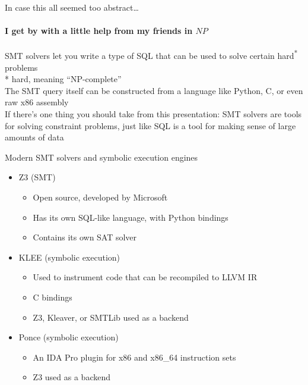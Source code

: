 \begin{frame}{In case this all seemed too abstract\ldots}
    \framesubtitle{I get by with a little help from my friends in $NP$}
    \begin{center}
        {\Large
            SMT solvers let you write a type of SQL \alert{that
            can be used to solve certain hard\textsuperscript{*} problems}
        } \pause \\
        * hard, meaning ``NP-complete'' \pause \\
        \vspace{0.25in}
        {\Large
            The SMT query itself can be constructed from a language like
            Python, C, or even raw x86 assembly
        } \pause \\
        \vspace{0.25in}
        {\Large
            If there's one thing you should take from this presentation:
            SMT solvers are tools for solving constraint problems, just like
            SQL is a tool for making sense of large amounts of data
        }
    \end{center}
\end{frame}

\begin{frame}{Modern SMT solvers and symbolic execution engines}
    \begin{itemize}
        \item<1-> \alert<4->{Z3} (SMT)
        \begin{itemize}
            \item<1-> Open source, developed by Microsoft
            \item<1-> Has its own SQL-like language, with Python bindings
            \item<1-> Contains its own SAT solver
        \end{itemize}
        \item<2-> KLEE (symbolic execution)
        \begin{itemize}
            \item<2-> Used to instrument code that can be recompiled to LLVM IR
            \item<2-> C bindings
            \item<2-> Z3, Kleaver, or SMTLib used as a backend
        \end{itemize}
        \item<3-> Ponce (symbolic execution)
        \begin{itemize}
            \item<3-> An IDA Pro plugin for x86 and x86\_64 instruction sets
            \item<3-> Z3 used as a backend
        \end{itemize}
    \end{itemize}

\end{frame}

